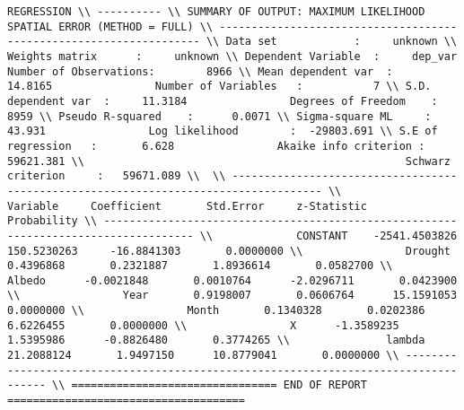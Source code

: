 \documentclass{article}
\begin{document}
\begin{verbatim} 
REGRESSION \\ ---------- \\ SUMMARY OF OUTPUT: MAXIMUM LIKELIHOOD SPATIAL ERROR (METHOD = FULL) \\ ------------------------------------------------------------------- \\ Data set            :     unknown \\ Weights matrix      :     unknown \\ Dependent Variable  :     dep_var                Number of Observations:        8966 \\ Mean dependent var  :     14.8165                Number of Variables   :           7 \\ S.D. dependent var  :     11.3184                Degrees of Freedom    :        8959 \\ Pseudo R-squared    :      0.0071 \\ Sigma-square ML     :      43.931                Log likelihood        :  -29803.691 \\ S.E of regression   :       6.628                Akaike info criterion :   59621.381 \\                                                  Schwarz criterion     :   59671.089 \\  \\ ------------------------------------------------------------------------------------ \\             Variable     Coefficient       Std.Error     z-Statistic     Probability \\ ------------------------------------------------------------------------------------ \\             CONSTANT    -2541.4503826     150.5230263     -16.8841303       0.0000000 \\                Drought       0.4396868       0.2321887       1.8936614       0.0582700 \\                Albedo      -0.0021848       0.0010764      -2.0296711       0.0423900 \\                Year       0.9198007       0.0606764      15.1591053       0.0000000 \\                Month       0.1340328       0.0202386       6.6226455       0.0000000 \\                X      -1.3589235       1.5395986      -0.8826480       0.3774265 \\               lambda      21.2088124       1.9497150      10.8779041       0.0000000 \\ ------------------------------------------------------------------------------------ \\ ================================ END OF REPORT =====================================
\end{verbatim} 
\end{document}
